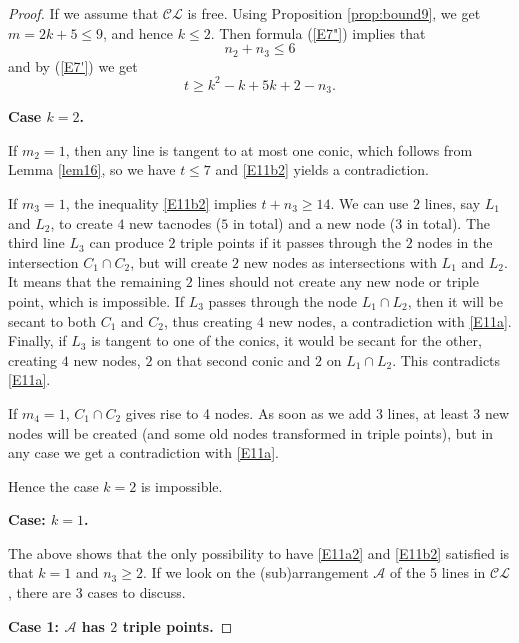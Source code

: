 \documentclass[10pt,a4paper]{amsart}
\begin{document}
\begin{proof}
If we assume that $\mathcal{CL}$ is free. Using Proposition \ref{prop:bound9}, we get $m = 2k+5 \leq 9$, and hence $k\leq 2$.
Then formula (\ref{E7"}) implies that
\begin{equation}
\label{E11a2}
n_2+ n_3 \leq 6
\end{equation}
and by (\ref{E7'}) we get
\begin{equation}
\label{E11b2}
t \geq k^2-k+5k+2-n_3.
\end{equation}

\medskip

{\bf Case $k=2$.}

\medskip

If $m_2=1$, then any line is tangent to at most one conic, which follows from Lemma \ref{lem16}, so we have $t \leq 7$ and \eqref{E11b2} yields a contradiction.

If $m_3=1$, the inequality \eqref{E11b2} implies $t + n_3 \geq 14$.
We can use $2$ lines, say $L_1$ and $L_2$, to create $4$ new tacnodes ($5$ in total) and a new node ($3$ in total). The third line $L_3$ can produce $2$ triple points if it passes through the $2$ nodes in the intersection $C_1 \cap C_2$, but will create $2$ new nodes as intersections with $L_1$ and $L_2$. It means that the remaining $2$ lines should not create any new node or triple point, which is impossible.  If $L_3$ passes through the node $L_1\cap L_2$, then it will be secant to both $C_1$ and $C_2$, thus creating 
$4$ new nodes, a contradiction with \eqref{E11a}.
Finally, if $L_3$ is tangent to one of the conics, it would be secant for the other, creating $4$ new nodes, $2$ on that second conic and $2$ on $L_1 \cap L_2$. This contradicts \eqref{E11a}.

If $m_4=1$, $C_1\cap C_2$ gives rise to 4 nodes. As soon as we add $3$ lines, at least $3$ new nodes will be created (and some old nodes transformed in triple points), but in any case we get a contradiction with \eqref{E11a}.

Hence the case $k=2$ is impossible.
\medskip

{\bf Case: $k=1$.}

\medskip
The above shows that the only possibility to have \eqref{E11a2} and \eqref{E11b2} satisfied is that $k=1$ and $n_3 \geq 2$.
If we look on the (sub)arrangement $\mathcal{A}$ of the $5$ lines in $\mathcal{CL}$, there are $3$ cases to discuss.

\medskip

{\bf Case 1: $\mathcal{A}$ has $2$ triple points.}


\end{proof}
\end{document}
